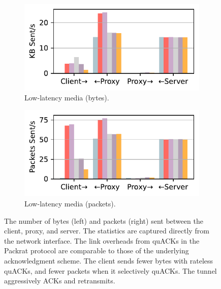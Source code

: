 \begin{figure}[ht]
\begin{minipage}[t]{0.68\textwidth}
    \begin{subfigure}[b]{0.49\linewidth}
        \centering
        \includegraphics[width=\linewidth]{packrat/figures/network_stats_media_tx_bytes.pdf}
        \caption{Low-latency media (bytes).}
        \label{fig:packrat:link-overheads:media-bytes}
    \end{subfigure}
    \begin{subfigure}[b]{0.49\linewidth}
        \centering
        \includegraphics[width=\linewidth]{packrat/figures/network_stats_media_tx_packets.pdf}
        \caption{Low-latency media (packets).}
        \label{fig:packrat:link-overheads:media-packets}
    \end{subfigure}
    
    \caption{The number of bytes (left) and packets (right) sent between the
     client, proxy, and server. The statistics are captured directly from the
     network interface. The link overheads from quACKs in the Packrat protocol are
     comparable to those of the underlying acknowledgment scheme. The client
     sends fewer bytes with rateless quACKs, and fewer packets when it
     selectively quACKs. The tunnel aggressively ACKs and retransmits.}
    \label{fig:packrat:link-overheads}
\end{minipage}
\end{figure}